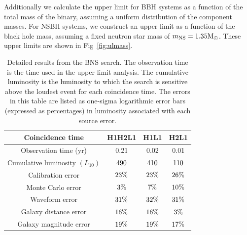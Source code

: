 Additionally we calculate the upper limit for \ac{BBH} systems
as a function of the total mass of the binary, assuming a uniform
distribution of the component masses.  For \ac{NSBH} systems, we
construct an upper limit as a function of the black hole mass, assuming
a fixed neutron star mass of $m_{\mathrm{NS}} = 1.35
\mathrm{M_\odot}$.  These upper limits are shown in Fig~\ref{fig:ulmass}.

%
\begin{table}[t]
\center
\begin{tabular}{c | c | c | c}
\hline \hline
\multicolumn{1}{m{5cm}|}{\centering Coincidence time} & H1H2L1 & H1L1 & H2L1 \\
\hline
\multicolumn{1}{m{5cm}|}{\centering Observation time (yr)} & 0.21 & 0.02 & 0.01 \\
\hline
\multicolumn{1}{m{5cm}|}{\centering Cumulative luminosity $\left({L_{10}}\right)$} & $490$ & $410$ & $110$ \\
\hline
\multicolumn{1}{m{5cm}|}{\centering Calibration error} & $23\%$ & $23\%$ & $26\%$ \\
\hline
\multicolumn{1}{m{5cm}|}{\centering Monte Carlo error} & $3\%$ & $7\%$ & $10\%$ \\
\hline
\multicolumn{1}{m{5cm}|}{\centering Waveform error} & $31\%$ & $32\%$ & $31\%$ \\
\hline
\multicolumn{1}{m{5cm}|}{\centering Galaxy distance error} & $16\%$ & $16\%$ & $3\%$ \\
\hline
\multicolumn{1}{m{5cm}|}{\centering Galaxy magnitude error} & $19\%$ & $19\%$ & $17\%$ \\
\hline
\hline
\end{tabular}
\caption{Detailed results from the \ac{BNS} search.  The observation
time is the time used in the upper limit analysis.  The cumulative
luminosity is the luminosity to which the search is sensitive above the
loudest event for each coincidence time.  The errors in this table are
listed as one-sigma logarithmic error bars (expressed as percentages) in
luminosity associated with each source error.}
\label{tab:bns}
\end{table}


